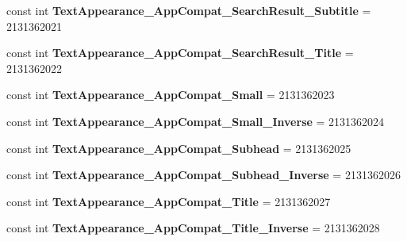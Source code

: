 \begin{DoxyCompactItemize}
\mbox{\label{class_sample_app_1_1_droid_1_1_resource_1_1_style_af42a5ba6d5d8724ea6ff9ae73de3d99b}} 
const int {\bfseries Text\+Appearance\+\_\+\+App\+Compat\+\_\+\+Search\+Result\+\_\+\+Subtitle} = 2131362021
\item 
\mbox{\label{class_sample_app_1_1_droid_1_1_resource_1_1_style_a7e58dd6b96395507fc4cafa90081c3fc}} 
const int {\bfseries Text\+Appearance\+\_\+\+App\+Compat\+\_\+\+Search\+Result\+\_\+\+Title} = 2131362022
\item 
\mbox{\label{class_sample_app_1_1_droid_1_1_resource_1_1_style_ada4a8c6c17fbbf818ca1a618a1507ab2}} 
const int {\bfseries Text\+Appearance\+\_\+\+App\+Compat\+\_\+\+Small} = 2131362023
\item 
\mbox{\label{class_sample_app_1_1_droid_1_1_resource_1_1_style_a951f98998717870b727e5e258d55fa76}} 
const int {\bfseries Text\+Appearance\+\_\+\+App\+Compat\+\_\+\+Small\+\_\+\+Inverse} = 2131362024
\item 
\mbox{\label{class_sample_app_1_1_droid_1_1_resource_1_1_style_a051140352090598502efc079c182e284}} 
const int {\bfseries Text\+Appearance\+\_\+\+App\+Compat\+\_\+\+Subhead} = 2131362025
\item 
\mbox{\label{class_sample_app_1_1_droid_1_1_resource_1_1_style_a293cabc42b73ef4a53e0709267eafecf}} 
const int {\bfseries Text\+Appearance\+\_\+\+App\+Compat\+\_\+\+Subhead\+\_\+\+Inverse} = 2131362026
\item 
\mbox{\label{class_sample_app_1_1_droid_1_1_resource_1_1_style_a650c4f46ed712d918753be5fef38fe8a}} 
const int {\bfseries Text\+Appearance\+\_\+\+App\+Compat\+\_\+\+Title} = 2131362027
\item 
\mbox{\label{class_sample_app_1_1_droid_1_1_resource_1_1_style_ac36569af3dbeea5cff6c9c874a5e6beb}} 
const int {\bfseries Text\+Appearance\+\_\+\+App\+Compat\+\_\+\+Title\+\_\+\+Inverse} = 2131362028

\end{DoxyCompactItemize}

